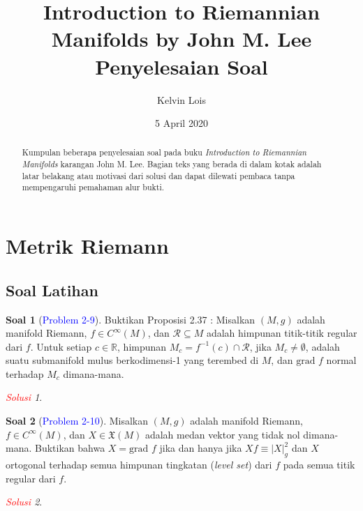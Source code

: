 \documentclass[11pt]{article}
\title{
  Introduction to Riemannian Manifolds by John M. Lee
  \\ \large{Penyelesaian Soal} }
\author{Kelvin Lois}
\date{5 April 2020}
\theoremstyle{definition}
\newtheorem*{problem}{Soal}
\theoremstyle{remark}
\newtheorem*{solution}{\textcolor{red}{Solusi}}
\newcommand{\er}{\mathbb{R}}            %
\newcommand{\CinfM}{C^{\infty}(M)}          %
\newcommand{\grad}{\text{grad }}
\newcommand{\vectfield}{\mathfrak{X}}       %
\begin{document}
 
\maketitle \tableofcontents 

\begin{abstract}
    Kumpulan beberapa penyelesaian soal pada buku \textit{Introduction to Riemannian Manifolds} karangan John M. Lee. Bagian teks yang berada di dalam kotak adalah latar belakang atau motivasi dari solusi dan dapat dilewati pembaca tanpa mempengaruhi pemahaman alur bukti.
\end{abstract}
\section{Metrik Riemann}

\subsection{Soal Latihan}
\begin{problem}[\textcolor{blue}{Problem 2-9}]
Buktikan Proposisi 2.37 : Misalkan $(M,g)$ adalah manifold Riemann, $f \in \CinfM$, dan $\mathcal{R} \subseteq M$ adalah himpunan titik-titik regular dari $f$. Untuk setiap $c \in \er$,  himpunan $M_c = f^{-1}(c) \cap \mathcal{R}$, jika $M_c \neq \emptyset$, adalah suatu submanifold mulus berkodimensi-1 yang terembed di $M$, dan $\grad f$ normal terhadap $M_c$ dimana-mana.   
\end{problem}
\begin{solution}

\end{solution}


\begin{problem}[\textcolor{blue}{Problem 2-10}]
Misalkan $(M,g)$ adalah manifold Riemann, $f \in \CinfM$, dan $X \in \vectfield(M)$ adalah medan vektor yang tidak nol dimana-mana. Buktikan bahwa $X= \grad f$ jika dan hanya jika $Xf \equiv |X|_g^2$ dan $X$ ortogonal terhadap semua himpunan tingkatan (\textit{level set}) dari $f$ pada semua titik regular dari $f$.
\end{problem}
\begin{solution}

\end{solution}
\end{document}
